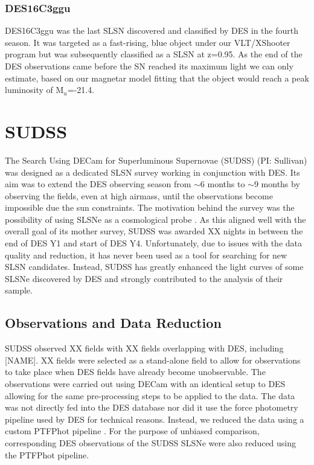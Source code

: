 \subsubsection{DES16C3ggu}
DES16C3ggu was the last SLSN discovered and classified by DES in the fourth season. It was targeted as a fast-rising, blue object under our VLT/XShooter program but was subsequently classified as a SLSN at z=0.95. As the end of the DES observations came before the SN reached its maximum light we can only estimate, based on our magnetar model fitting that the object would reach a peak luminosity of M$_u$=-21.4.

\section{SUDSS}
The Search Using DECam for Superluminous Supernovae (SUDSS) (PI: Sullivan) was designed as a dedicated SLSN survey working in conjunction with DES. Its aim was to extend the DES observing season from $\sim$6 months to $\sim$9 months by observing the fields, even at high airmass, until the observations become impossible due the sun constraints. The motivation behind the survey was the possibility of using SLSNe as a cosmological probe \citep{Inserra2014}. As this aligned well with the overall goal of its mother survey, SUDSS was awarded XX nights in between the end of DES Y1 and start of DES Y4. Unfortunately, due to issues with the data quality and reduction, it has never been used as a tool for searching for new SLSN candidates. Instead, SUDSS has greatly enhanced the light curves of some SLSNe discovered by DES and strongly contributed to the analysis of their sample.

\subsection{Observations and Data Reduction}
SUDSS observed XX fields with XX fields overlapping with DES, including [NAME]. XX fields were selected as a stand-alone field to allow for observations to take place when DES fields have already become unobservable. The observations were carried out using DECam with an identical setup to DES allowing for the same pre-processing steps to be applied to the data. The data was not directly fed into the DES database nor did it use the force photometry pipeline used by DES for technical reasons. Instead, we reduced the data using a custom PTFPhot pipeline \citep{Firth2015}. For the purpose of unbiased comparison, corresponding DES observations of the SUDSS SLSNe were also reduced using the PTFPhot pipeline.


